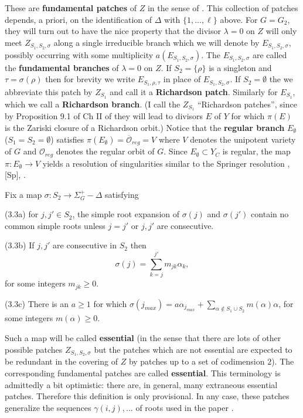 \documentclass[12pt,letterpaper]{amsart}
\begin{document}
\noindent
These are \textbf{fundamental patches} of $Z$ in the sense of \cite{Ha92a}.
This collection of patches depends, a priori, on the
identification of $\Delta$ with $\{1,...,\ell\}$ above.
For $G=G_2$, they will turn out to have the
nice property that the divisor $\lambda =0$ on $Z$ will only meet
$Z_{S_1,S_2,\sigma}$ along a single irreducible branch which we will denote
by $E_{S_1,S_2,\sigma}$, possibly
occurring with some multiplicity $a(E_{S_1,S_2,\sigma})$.
The $E_{S_1,S_2,\sigma}$ are called the \textbf{fundamental branches} of
$\lambda =0$ on $Z$. If $S_2=\{\rho\}$ is a singleton and
$\tau=\sigma(\rho)$ then for brevity
we write $E_{S_1,\rho,\tau}$ in place of $E_{S_1,S_2,\sigma}$.
If $S_2 =\emptyset$ the we abbreviate this patch by
$Z_{S_1}$ and call it a \textbf{Richardson patch}.
Similarly for $E_{S_1}$, which we call a \textbf{Richardson branch}.
(I call the $Z_{S_1}$
``Richardson patches'', since by Proposition 9.1 of Ch II of \cite{Ha92a}
they will lead to divisors $E$ of $Y$ for which
$\pi(E)$ is the Zariski closure of a Richardson orbit.) Notice that the
\textbf{regular branch} $E_\emptyset$ ($S_1=S_2=\emptyset$) satisfies
$\pi(E_\emptyset)=\overline{\mathcal O}_{reg}=V$ where $V$ denotes the unipotent
variety of $G$ and ${\mathcal O}_{reg}$ denotes the regular orbit of
$G$. Since $E_\emptyset\subset Y_C$ is regular,
the map $\pi:E_\emptyset \rightarrow V$ yields a resolution of singularities
similar to the Springer resolution \cite{Sl80}, [Sp], \cite{St74}.

Fix a map $\sigma :S_2 \rightarrow \Sigma_G^+ -\Delta$ satisfying

\noindent
(3.3a) for $j,j'\in S_2$, the simple root expansion of $\sigma(j)$ and
$\sigma(j')$ contain no common simple roots unless $j=j'$ or
$j,j'$ are consecutive.

\noindent
(3.3b) If $j,j'$ are consecutive in $S_2$ then
\[
\sigma(j)=\sum_{k=j}^{j'}m_{jk}\alpha_k,
\]
for some integers $m_{jk}\geq 0$.

\noindent
(3.3c) There is an $a\geq 1$ for which $\sigma(j_{max})
=a\alpha_{j_{max}}+\sum_{\alpha\notin S_1\cup S_2}m(\alpha)\alpha$,
for some integers $m(\alpha)\geq 0$.

Such a map will be called \textbf{essential} (in the sense that there
are lots of other possible patches $Z_{S_1,S_2,\sigma}$ but the
patches which are not essential are expected to be
redundant in the covering of $Z$ by patches up to a set of codimension $2$).
The corresponding fundamental patches are called \textbf{essential}.
This terminology is admittedly a bit optimistic: there are, in general,
many extraneous essential patches. Therefore this definition is
only provisional. In any case, these patches generalize the
sequences $\gamma(i,j),...$ of roots used in the paper \cite{Ha89}.
\end{document}
